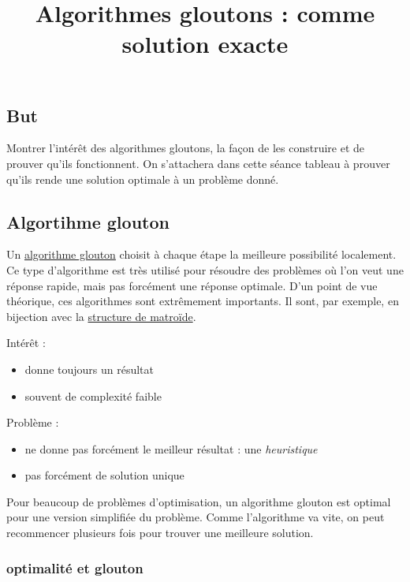 \documentclass[
]{article}
\title{Algorithmes gloutons : comme solution exacte}
\author{}
\date{}
\providecommand{\tightlist}{%
  \setlength{\itemsep}{0pt}\setlength{\parskip}{0pt}}
\begin{document}
\maketitle

\hypertarget{but}{%
\subsection{But}\label{but}}

Montrer l'intérêt des algorithmes gloutons, la façon de les construire
et de prouver qu'ils fonctionnent. On s'attachera dans cette séance
tableau à prouver qu'ils rende une solution optimale à un problème
donné.

\hypertarget{algortihme-glouton}{%
\subsection{Algortihme glouton}\label{algortihme-glouton}}

Un \href{https://fr.wikipedia.org/wiki/Algorithme_glouton}{algorithme
glouton} choisit à chaque étape la meilleure possibilité localement. Ce
type d'algorithme est très utilisé pour résoudre des problèmes où l'on
veut une réponse rapide, mais pas forcément une réponse optimale. D'un
point de vue théorique, ces algorithmes sont extrêmement importants. Il
sont, par exemple, en bijection avec la
\href{https://fr.wikipedia.org/wiki/Matro\%C3\%AFde}{structure de
matroïde}.

Intérêt :

\begin{itemize}
\tightlist
\item
  donne toujours un résultat
\item
  souvent de complexité faible
\end{itemize}

Problème :

\begin{itemize}
\tightlist
\item
  ne donne pas forcément le meilleur résultat : une \emph{heuristique}
\item
  pas forcément de solution unique
\end{itemize}

Pour beaucoup de problèmes d'optimisation, un algorithme glouton est
optimal pour une version simplifiée du problème. Comme l'algorithme va
vite, on peut recommencer plusieurs fois pour trouver une meilleure
solution.

\hypertarget{optimalituxe9-et-glouton}{%
\subsubsection{optimalité et glouton}\label{optimalituxe9-et-glouton}}
\end{document}
